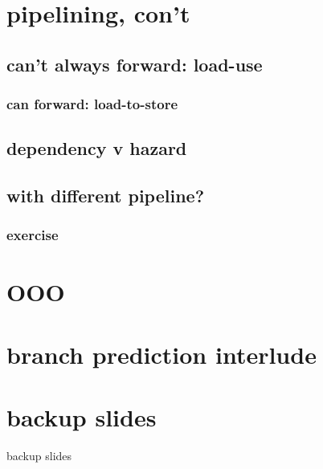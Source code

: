 \section{pipelining, con't}

\subsection{can't always forward: load-use}


\subsubsection{can forward: load-to-store}






\subsection{dependency v hazard}




\subsection{with different pipeline?}


\subsubsection{exercise}


\section{OOO}


\section{branch prediction interlude}


\section{backup slides}
\begin{frame}{backup slides}
\end{frame}




